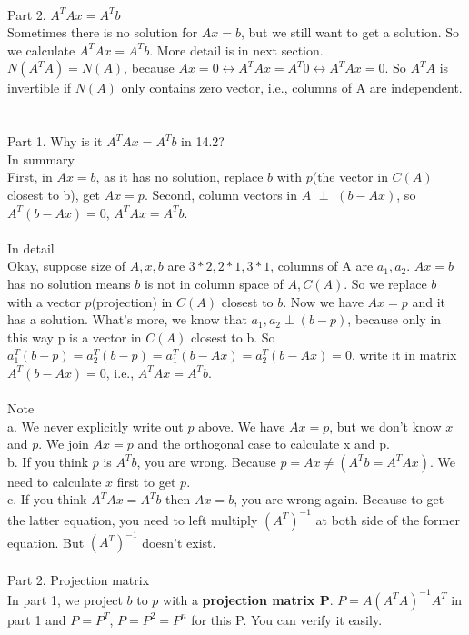 \documentclass{article}
\begin{document}
\begin{spacing}{1.5}
\\Part 2. $A^TAx=A^Tb$\\
Sometimes there is no solution for $Ax=b$, but we still want to get a solution. So we calculate $A^TAx=A^Tb$. More detail is in next section.\\
$N(A^TA)=N(A)$, because $Ax=0 \leftrightarrow A^TAx=A^T0 \leftrightarrow A^TAx=0$.
So $A^TA$ is invertible if $N(A)$ only contains zero vector, i.e., columns of A are independent.\\


\section{}
Part 1. Why is it $A^TAx=A^Tb$ in 14.2? \\
In summary \\
First, in $Ax=b$, as it has no solution, replace $b$ with $p$(the vector in $C(A)$ closest to b), get $Ax=p$. Second, column vectors in $A$ $\perp$ $(b-Ax)$, so $A^T(b-Ax)=0$, $A^TAx=A^Tb$.\\
\\ In detail \\
Okay, suppose size of $A, x, b$ are $3*2, 2*1, 3*1$, columns of A are $a_1, a_2$. $Ax=b$ has no solution means $b$ is not in column space of $A, C(A)$. So we replace $b$ with a vector $p$(projection) in $C(A)$ closest to $b$. Now we have $Ax=p$ and it has a solution. What's more, we know that $a_1, a_2 \perp (b-p)$, because only in this way p is a vector in $C(A)$ closest to b. So $a_1^T(b-p) = a_2^T(b-p) = a_1^T(b-Ax) = a_2^T(b-Ax) = 0$, write it in matrix $A^T(b-Ax)=0$, i.e., $A^TAx = A^Tb$. \\
\\Note \\
a. We never explicitly write out $p$ above. We have $Ax=p$, but we don't know $x$ and $p$. We join $Ax=p$ and the orthogonal case to calculate x and p.\\
b. If you think $p$ is $A^Tb$, you are wrong. Because $p=Ax \neq (A^Tb=A^TAx)$. We need to calculate $x$ first to get $p$.\\
c. If you think $A^TAx = A^Tb$ then $Ax = b$, you are wrong again. Because to get the latter equation, you need to left multiply $(A^T)^{-1}$ at both side of the former equation. But $(A^T)^{-1}$ doesn't exist. \\
\\Part 2. Projection matrix\\
In part 1, we project $b$ to $p$ with a {\bfseries projection matrix P}. $P=A(A^TA)^{-1}A^T$ in part 1 and $P=P^T$, $P=P^2=P^n$ for this P. You can verify it easily. \\

\end{spacing}
\end{document}
